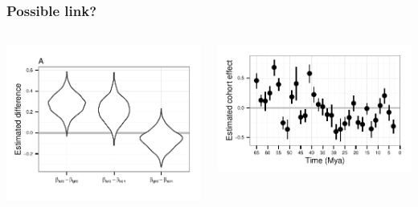 \documentclass{beamer}
\begin{document}
\begin{frame}
  \frametitle{Possible link?}
  \begin{columns}
    \begin{column}{0.55\textwidth}
      \includegraphics[width=\textwidth,height=0.8\textheight,keepaspectratio=true]{figure/loco_diff_est}
    \end{column}
    \begin{column}{0.55\textwidth}
      \includegraphics[width=\textwidth,height=\textheight,keepaspectratio=true]{figure/cohort_est}
    \end{column}
  \end{columns}

\end{frame}
\end{document}
